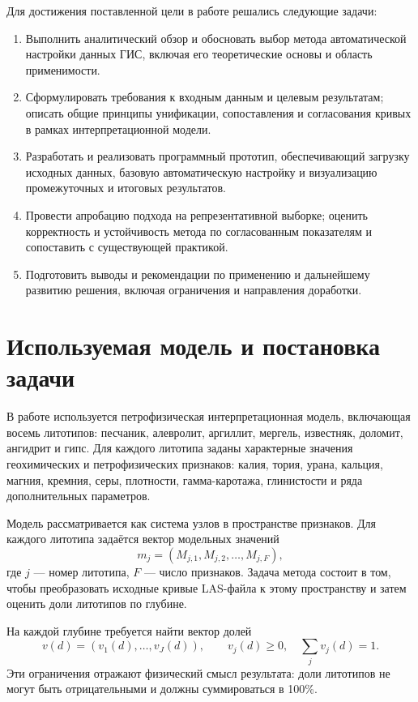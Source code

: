 \documentclass[master,summary]{pmk-graduate}
\begin{document}
Для достижения поставленной цели в работе решались следующие задачи:
\begin{enumerate}
    \item Выполнить аналитический обзор и обосновать выбор метода автоматической настройки данных ГИС, включая его теоретические основы и область применимости.
    \item Сформулировать требования к входным данным и целевым результатам; описать общие принципы унификации, сопоставления и согласования кривых в рамках интерпретационной модели.
    \item Разработать и реализовать программный прототип, обеспечивающий загрузку исходных данных, базовую автоматическую настройку и визуализацию промежуточных и итоговых результатов.
    \item Провести апробацию подхода на репрезентативной выборке; оценить корректность и устойчивость метода по согласованным показателям и сопоставить с существующей практикой.
    \item Подготовить выводы и рекомендации по применению и дальнейшему развитию решения, включая ограничения и направления доработки.
\end{enumerate}

\section{Используемая модель и постановка задачи}

В работе используется петрофизическая интерпретационная модель, включающая восемь литотипов: песчаник, алевролит, аргиллит, мергель, известняк, доломит, ангидрит и гипс. Для каждого литотипа заданы характерные значения геохимических и петрофизических признаков: калия, тория, урана, кальция, магния, кремния, серы, плотности, гамма-каротажа, глинистости и ряда дополнительных параметров.

Модель рассматривается как система узлов в пространстве признаков. Для каждого литотипа задаётся вектор модельных значений
\[
    m_j=(M_{j,1},M_{j,2},\ldots,M_{j,F}),
\]
где $j$ --- номер литотипа, $F$ --- число признаков. Задача метода состоит в том, чтобы преобразовать исходные кривые LAS-файла к этому пространству и затем оценить доли литотипов по глубине.

На каждой глубине требуется найти вектор долей
\[
    v(d)=(v_1(d),\ldots,v_J(d)), \qquad v_j(d)\ge 0,\quad \sum_j v_j(d)=1.
\]
Эти ограничения отражают физический смысл результата: доли литотипов не могут быть отрицательными и должны суммироваться в 100\%.
\end{document}
